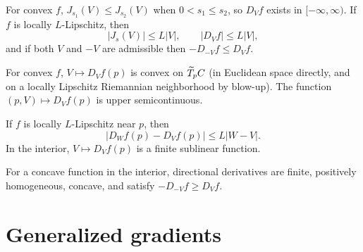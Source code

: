 \begin{lemma}
\label{lem:chow-iii-h25-directional-properties}
For convex $f$, $J_{s_1}(V)\le J_{s_2}(V)$ when $0<s_1\le s_2$, so $D_Vf$ exists
in $[-\infty,\infty)$.  If $f$ is locally $L$-Lipschitz, then
\[
|J_s(V)|\le L|V|,\qquad |D_Vf|\le L|V|,
\]
and if both $V$ and $-V$ are admissible then $-D_{-V}f\le D_Vf$.
\end{lemma}

\begin{lemma}
\label{lem:chow-iii-h26-directional-convexity-usc}
For convex $f$, $V\mapsto D_Vf(p)$ is convex on $\widetilde T_pC$ (in Euclidean space directly,
and on a locally Lipschitz Riemannian neighborhood by blow-up).  The function
$(p,V)\mapsto D_Vf(p)$ is upper semicontinuous.
\end{lemma}

\begin{lemma}
\label{lem:chow-iii-h27-directional-sublinear}
If $f$ is locally $L$-Lipschitz near $p$, then
\[
|D_Wf(p)-D_Vf(p)|\le L|W-V|.
\]
In the interior, $V\mapsto D_Vf(p)$ is a finite sublinear function.
\end{lemma}

\begin{remark}
\label{rem:chow-iii-h28-concave-directional-derivatives}
For a concave function in the interior, directional derivatives are finite, positively
homogeneous, concave, and satisfy $-D_{-V}f\ge D_Vf$.
\end{remark}

\section{Generalized gradients}


